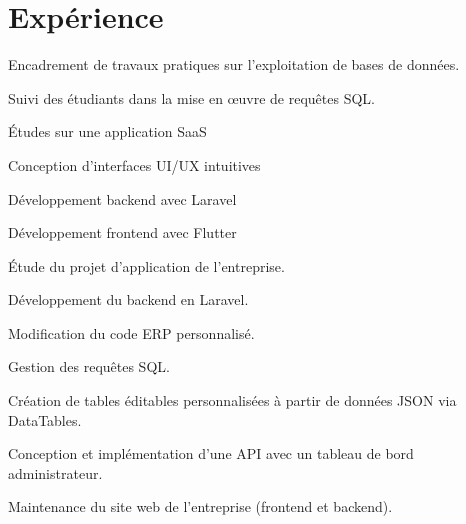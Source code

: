 \documentclass[]{deedy-resume-openfont}
\begin{document}
%
%

\section{Expérience}
\hfill {}
\begin{tightemize}
    \item Encadrement de travaux pratiques sur l’exploitation de bases de données.
    \item Suivi des étudiants dans la mise en œuvre de requêtes SQL.
\end{tightemize}
\sectionsep


\descript{}\hfill {}
\begin{tightemize}
	\item Études sur une application SaaS
	\item Conception d’interfaces UI/UX intuitives
	\item Développement backend avec Laravel
	\item Développement frontend avec Flutter
\end{tightemize} 
\sectionsep

\hfill {}
\begin{tightemize}
	\item Étude du projet d'application de l'entreprise.
	\item Développement du backend en Laravel.
\end{tightemize} 
\sectionsep

\hfill {}
\begin{tightemize}
	 \item Modification du code ERP personnalisé.
	 \item Gestion des requêtes SQL.
	 \item Création de tables éditables personnalisées à partir de données JSON via DataTables.
\end{tightemize} 
\sectionsep

\hfill {}
\begin{tightemize}
	\item Conception et implémentation d'une API avec un tableau de bord administrateur.
	\item Maintenance du site web de l'entreprise (frontend et backend).
\end{tightemize}
\sectionsep
\end{document}
